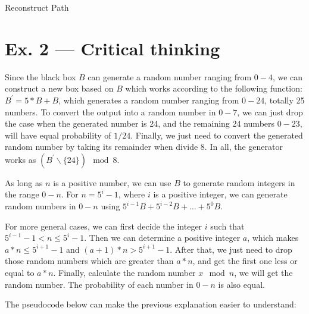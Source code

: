 \documentclass[12pt, a4paper]{article}
\begin{document}
\begin{enumerate}
          \begin{algorithm}[!htb]
              \caption{Reconstruct Path}

          \end{algorithm}
\end{enumerate}

\newpage
\section*{Ex. 2 --- Critical thinking}
Since the black box $B$ can generate a random number ranging from $0-4$, we can construct a new box based on $B$ which works according to the following function:
$B^\prime = 5*B + B$, which generates a random number ranging from $0-24$, totally 25 numbers. To convert the output into a random number in $0-7$, 
we can just drop the case when the generated number is 24, and the remaining 24 numbers $0-23$, will have equal probability of $1/24$. 
Finally, we just need to convert the generated random number by taking its remainder when divide 8. In all, 
the generator works as $(B^\prime\backslash\{24\}) \mod 8$.

As long as $n$ is a positive number, we can use $B$ to generate random integers in the range $0-n$. For $n = 5^i - 1$, where $i$ is a positive integer, 
we can generate random numbers in $0-n$ using $5^{i-1}B + 5^{i-2}B + \dots + 5^0 B$.

For more general cases, we can first decide the integer $i$ such that $5^{i - 1} - 1 < n \leq 5^{i} - 1$. 
Then we can determine a positive integer $a$, which makes $a*n \leq 5^{i+1} - 1$ and $(a+1)*n > 5^{i+1} - 1$. 
After that, we just need to drop those random numbers which are greater than $a*n$, and get the first one less or equal to $a*n$. 
Finally, calculate the random number $x \mod n$, we will get the random number.
The probability of each number in $0-n$ is also equal.

The pseudocode below can make the previous explanation easier to understand:
\end{document}
